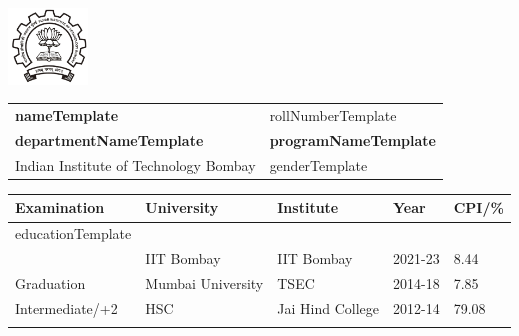 \documentclass[a4paper,10pt]{article}
\begin{document}


\begin{table}
    \begin{minipage}{0.15\linewidth}
        \centering
        \includegraphics[height =0.8in]{iit_logo.png}
    \end{minipage}
    \begin{minipage}{0.65\linewidth}
        \setlength{\tabcolsep}{70pt}
        \def\arraystretch{1.15}
        \begin{tabular}{ll}
            \textbf{\Large{nameTemplate}}  &  {rollNumberTemplate} \\
            \textbf{departmentNameTemplate} & \textbf{programNameTemplate} \\
            Indian Institute of Technology Bombay &  {genderTemplate}\\
        \end{tabular}
    \end{minipage}\hfill
\end{table}    

\setlength{\tabcolsep}{25pt}
\begin{table}
\centering
\begin{tabular}{lllll}
\toprule
\textbf{Examination}    & \textbf{University}   & \textbf{Institute}    & \textbf{Year}     & \textbf{CPI/\%} \\ 
\toprule
educationTemplate
\bottomrule \\[-0.75cm]

\end{tabular}
\end{table}
\end{document}
